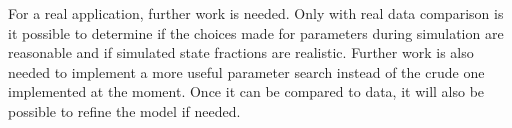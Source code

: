 For a real application, further work is needed. Only with real data comparison is it possible to determine if the choices made for parameters during simulation are reasonable and if simulated state fractions are realistic. Further work is also needed to implement a more useful parameter search instead of the crude one implemented at the moment. Once it can be compared to data, it will also be possible to refine the model if needed.


